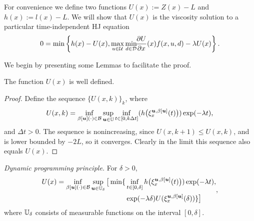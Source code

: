 \begin{for_journal}
For convenience we define two functions ${U(x):=Z(x)-L}$ and ${h(x):=l(x)-L}$. 
We will show that $U(x)$ is the viscosity solution to a particular time-independent HJ equation
%
\begin{equation}\label{eq:HJ_mdr}
    0 = \min\left\{h(x)-U(x), \max_{u\in\mathcal{U}} \min_{ d\in\mathcal{D}} \!\!\frac{\partial U}{\partial x}(x) f(x,u, d) - \lambda U(x)\right\}.
\end{equation}

We begin by presenting some Lemmas to facilitate the proof.
%
\begin{lemma}
The function $U(x)$ is well defined. 
\end{lemma} 
%
\begin{proof}
Define the sequence $\{U(x,k)\}_k$, where
%
\begin{equation}
U(x,k) = \inf_{\beta[\bm{u}](\cdot) \in \mathcal{B}} \sup_{\bm{u} \in \mathbb{U}} \inf_{t \in [0,k\Delta t]}(h\big(\xi_{x}^{\bm{u},\beta[\bm{u}]}(t)\big))\exp(-\lambda  t),
\end{equation}
%
and $\Delta t>0$. The sequence is nonincreasing, since $U(x,k+1) \leq U(x,k)$, and is lower bounded by $-2L$, so it converges. Clearly in the limit this sequence also equals $U(x)$.
\end{proof}



\begin{lemma} \label{dpp}
\emph{Dynamic programming principle.} For $\delta>0$,
%
\begin{equation}
\begin{split} 
U(x)= \inf_{\beta[\bm{u}](\cdot) \in \mathcal{B}} \sup_{\bm{u} \in \mathbb{U}_\delta} 
\big [
\min\{&\inf_{t \in [0, \delta]} h\big(\xi_{x}^{\bm{u},\beta[\bm{u}]}(t)\big))\exp(-\lambda  t), 
\\&\exp(-\lambda \delta)U(\xi_{x}^{\bm{u},\beta[\bm{u}]}(\delta))\}
\big ]
\end{split},
\end{equation}
%
where $\mathbb{U}_{\delta}$ consists of measurable functions on the interval
$[0,\delta]$.
\end{lemma}


\end{for_journal}
